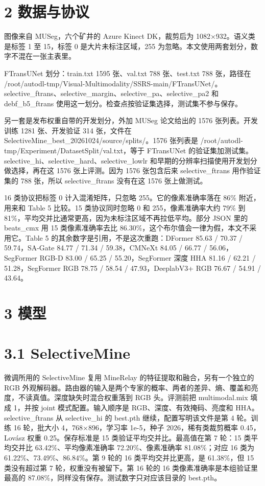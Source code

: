 \documentclass[11pt]{article}
\begin{document}
\section*{2  数据与协议}
图像来自 MUSeg，六个矿井的 Azure Kinect DK，裁剪后为 1082×932。语义类是标签 1 至 15，标签 0 是大片未标注区域，255 为忽略。本文使用两套划分，数字不混在一张主表里。

FTransUNet 划分：train.txt 1595 张、val.txt 788 张、test.txt 788 张，路径在 /root/autodl-tmp/Visual-Multimodality/SSRS-main/FTransUNet/。selective\_ftrans、selective\_margin、selective\_pa、selective\_pa2 和 debf\_b5\_ftrans 使用这一划分。检查点按验证集选择，测试集不参与保存。

另一套是发布权重自带的开发划分，外加 MUSeg 论文给出的 1576 张列表。开发训练 1281 张、开发验证 314 张，文件在 SelectiveMine\_best\_20261024/source/splits/。1576 张列表是 /root/autodl-tmp/Experiment/DatasetSplit/val.txt，等于 FTransUNet 的验证集加测试集。selective\_hi、selective\_hard、selective\_lowlr 和早期的分辨率扫描使用开发划分做选择，再在这 1576 张上评测。因为 1576 张包含后来 selective\_ftrans 用作验证集的 788 张，所以 selective\_ftrans 没有在这 1576 张上做测试。

16 类协议把标签 0 计入混淆矩阵，只忽略 255。它的像素准确率落在 86\% 附近，用来和 Table 5 比较。15 类协议同时忽略 0 和 255，像素准确率大约 79\% 到 81\%，平均交并比通常更高，因为未标注区域不再拉低平均。部分 JSON 里的 beats\_cmx 用 15 类像素准确率去比 86.30\%，这个布尔值会一律为假，本文不采用它。Table 5 的其余数字是引用，不是这次重跑：DFormer 85.63 / 70.37 / 59.74，SA-Gate 84.77 / 71.34 / 59.38，CMNeXt 84.05 / 66.77 / 56.06，SegFormer RGB-D 83.00 / 65.25 / 55.20，SegFormer 深度 HHA 81.16 / 62.21 / 51.28，SegFormer RGB 78.75 / 58.54 / 47.93，DeeplabV3+ RGB 76.67 / 54.91 / 43.64。

\section*{3  模型}
\section*{3.1  SelectiveMine}
微调所用的 SelectiveMine 复用 MineRelay 的特征提取和融合，另有一个独立的 RGB 外观解码器。路由器的输入是两个专家的概率、两者的差异、熵、覆盖和亮度，不读真值。深度缺失时混合权重落到 RGB 头。评测前把 multimodal.mix 填成 1，并按 joint 模式配置。输入顺序是 RGB、深度、有效掩码、亮度和 HHA。selective\_ftrans 从 selective\_hi 的 best.pth 继续，配置写明该文件是第 4 轮。训练 16 轮，批大小 4，768×896，学习率 1e-5，种子 2026，稀有类裁剪概率 0.45，Lovász 权重 0.25。保存标准是 15 类验证平均交并比。最高值在第 7 轮：15 类平均交并比 63.42\%、平均像素准确率 72.20\%、像素准确率 81.08\%；对应 16 类为 61.22\%、73.49\%、86.84\%。第 9 轮的 16 类平均交并比更高，是 61.38\%，但 15 类没有超过第 7 轮，权重没有被留下。第 16 轮的 16 类像素准确率是本组验证里最高的 87.08\%，同样没有保存。测试数字只对应该目录的 best.pth。
\end{document}
